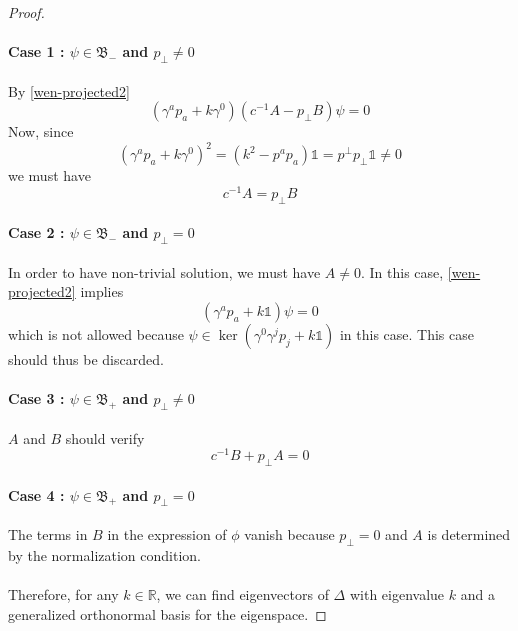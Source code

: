 \begin{proof}
\paragraph{Case 1 : $\psi \in \mathfrak{B}_-$ and $p_\bot \neq 0$} 
By \cref{wen-projected2}
\begin{equation*}
(\gamma^a p_a + k\gamma^0)(c^{-1}A - p_\bot B) \psi = 0
\end{equation*}
Now, since 
\begin{equation*}
(\gamma^a p_a + k\gamma^0)^2 = ( k^2 - p^a p_a ) \mathbb{1}= p^\bot p_\bot \mathbb{1} \neq 0
\end{equation*}
we must have 
\begin{equation*}
c^{-1} A = p_\bot B
\end{equation*}
\paragraph{Case 2 : $\psi \in \mathfrak{B}_-$ and $p_\bot = 0$}
In order to have non-trivial solution, 
we must have $A \neq 0$. 
In this case, 
\cref{wen-projected2} implies 
\begin{equation*}
(\gamma^a p_a + k \mathbb{1})\psi = 0
\end{equation*}
which is not allowed because $\psi\in\ker(\gamma^0\gamma^jp_j + k\mathbb{1})$ in this case. 
This case should thus be discarded.
\paragraph{Case 3 : $\psi \in \mathfrak{B}_+$ and $p_\bot \neq 0$}
$A$ and $B$ should verify 
\begin{equation*}
c^{-1} B + p_\bot A = 0
\end{equation*}
\paragraph{Case 4 : $\psi \in \mathfrak{B}_+$ and $p_\bot = 0$}
The terms in $B$ in the expression of $\phi$ vanish because  $p_\perp = 0$ and $A$ is determined by the normalization condition.
\\\\
Therefore, for any $k\in\mathbb{R}$, 
we can find eigenvectors of $\Delta$ with eigenvalue $k$ and a generalized orthonormal basis for the eigenspace.
\end{proof}